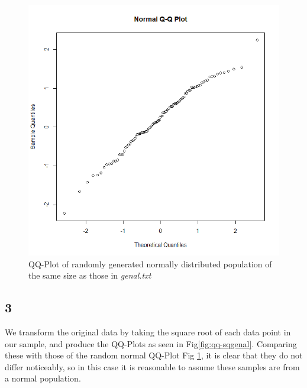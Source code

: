 \documentclass{article}
\begin{document}
    \begin{figure}[H]
    \centering
      \includegraphics[scale=0.3]{../results/3_2_2.png}
      \caption{QQ-Plot of randomly generated normally distributed population of the same size as those in \textit{genal.txt}}
      \label{fig:qq-nrml}
    \end{figure}
    
    \subsection*{3}
    We transform the original data by taking the square root of each data point in our sample, and produce the QQ-Plots as seen in Fig\ref{fig:qq-sqgenal}. Comparing these with those of the random normal QQ-Plot Fig \ref{fig:qq-nrml}, it is clear that they do not differ noticeably, so in this case it is reasonable to assume these samples are from a normal population.
     
\end{document}
